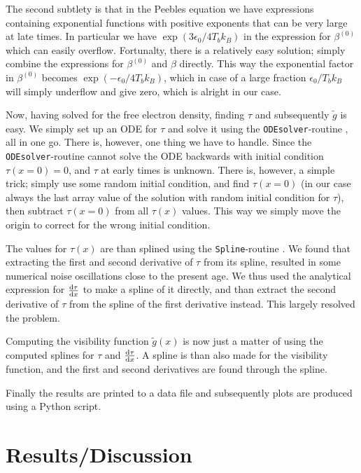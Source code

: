 \documentclass[twocolumn]{aastex62}
\begin{document}
The second subtlety is that in the Peebles equation we have expressions containing exponential functions with positive exponents that can be very large at late times. In particular we have $\exp\left(3\epsilon_0 / 4T_b k_B\right)$ in the expression for $\beta^{(0)}$ which can easily overflow. Fortunalty, there is a relatively easy solution; simply combine the expressions for $\beta^{(0)}$ and $\beta$ directly. This way the exponential factor in $\beta^{(0)}$ becomes $\exp\left(-\epsilon_0 / 4T_b k_B\right)$, which in case of a large fraction $\epsilon_0 / T_b k_B$ will simply underflow and give zero, which is alright in our case.

Now, having solved for the free electron density, finding $\tau$ and subsequently $\tilde{g}$ is easy. We simply set up an ODE for $\tau$ and solve it using the \texttt{ODEsolver}-routine \citep[]{winther:2020}, all in one go. There is, however, one thing we have to handle. Since the \texttt{ODEsolver}-routine cannot solve the ODE backwards with initial condition $\tau(x = 0) = 0$, and $\tau$ at early times is unknown. There is, however, a simple trick; simply use some random initial condition, and find $\tau(x=0)$ (in our case always the last array value of the solution with random initial condition for $\tau$), then subtract $\tau(x = 0)$ from all $\tau(x)$ values. This way we simply move the origin to correct for the wrong initial condition. 

The values for $\tau(x)$ are than splined using the \texttt{Spline}-routine \citep[]{winther:2020}. We found that extracting the first and second derivative of $\tau$ from its spline, resulted in some numerical noise oscillations close to the present age. We thus used the analytical expression for $\dv{\tau}{x}$ to make a spline of it directly, and than extract the second derivative of $\tau$ from the spline of the first derivative instead. This largely resolved the problem. 

Computing the visibility function $\tilde{g}(x)$ is now just a matter of using the computed splines for $\tau$ and $\dv{\tau}{x}$. A spline is than also made for the visibility function, and the first and second derivatives are found through the spline. 

Finally the results are printed to a data file and subsequently plots are produced using a Python script.


\section{Results/Discussion}\label{sec:Results}
\end{document}
